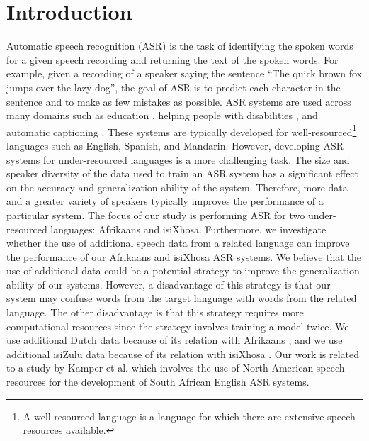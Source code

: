 \graphicspath{{introduction/fig/}}


\chapter{Introduction} \label{chap:introduction}
Automatic speech recognition (ASR) is the task of identifying the spoken words for a given speech recording and returning the text of the spoken words.
For example, given a recording of a speaker saying the sentence ``The quick brown fox jumps over the lazy dog'',
the goal of ASR is to predict each character in the sentence and to make as few mistakes as possible.
ASR systems are used across many domains such as education \cite{wald2005using}, 
helping people with disabilities \cite{terbeh2013automatic}, and automatic captioning \cite{wald2006captioning}.
These systems are typically developed for well-resourced\footnote{A well-resourced language is a language for which there are extensive speech resources available.} languages such as English, Spanish, and Mandarin.
However, developing ASR systems for under-resourced languages is a more challenging task.
The size and speaker diversity of the data used to train an ASR system has a significant effect on the accuracy and generalization ability of the system.
Therefore, more data and a greater variety of speakers typically improves the performance of a particular system.
The focus of our study is performing ASR for two under-resourced languages: Afrikaans and isiXhosa.
Furthermore, we investigate whether the use of additional speech data from a
related language can improve the performance of our Afrikaans and isiXhosa ASR systems.
We believe that the use of additional data could be a potential strategy to improve the generalization ability of our systems.
However, a disadvantage of this strategy is that our system may confuse words from the target language with words from the related language.
The other disadvantage is that this strategy requires more computational resources since the strategy involves training a model twice.
We use additional Dutch data because of its relation with Afrikaans \cite{wikipedia2023comparison_afrikaans_dutch}, 
and we use additional isiZulu data because of its relation with isiXhosa \cite{msskapstadt2023progressively_repurpose}.
Our work is related to a study by Kamper et al. \cite{kamper2014capitalising} which involves the use of North American speech resources for the development of South African English ASR systems.

